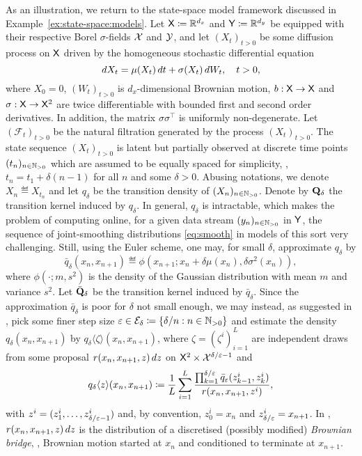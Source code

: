 \begin{example}
\label{eq:durham:gallant}
As an illustration, we return to the state-space model framework discussed in Example~\ref{ex:state-space:models}. Let $\mathsf{X} \coloneqq \mathbb{R}^{d_x}$ and $\mathsf{Y} \coloneqq \mathbb{R}^{d_y}$ be equipped with their respective Borel $\sigma$-fields $\mathcal{X}$ and $\mathcal{Y}$, and let $(X_t)_{t > 0}$ be some diffusion process on $\mathsf{X}$ driven by the homogeneous stochastic differential equation
\begin{equation} \label{eq:SDE}
\rmd X_t = \mu(X_t) \, \rmd t + \sigma(X_t) \, \rmd W_t, \quad t > 0, 
\end{equation}
where $X_0 = 0$, $(W_t)_{t > 0}$ is $d_x$-dimensional Brownian motion, $b : \mathsf{X} \to \mathsf{X}$ and $\sigma : \mathsf{X} \to \mathsf{X}^2$ are twice differentiable with bounded first and second order derivatives. In addition, the matrix $\sigma \sigma^\intercal$ is uniformly non-degenerate. Let $(\mathcal{F}_t)_{t > 0}$ be the natural filtration generated by the process $(X_t)_{t > 0}$. The state sequence $(X_t)_{t > 0}$ is latent but partially observed at discrete time points $(t_n)_{n \in \mathbb{N}_{> 0}}$ which are assumed to be equally spaced for simplicity, \ie, $t_n = t_1 + \delta (n - 1)$ for all $n$ and some $\delta > 0$. Abusing notations, we denote $X_n \eqdef X_{t_n}$ and let $q_\delta$ be the transition density of $(X_n)_{n \in \mathbb{N}_{> 0}}$. Denote by $\mathbf{Q}_\delta$ the transition kernel induced by $q_\delta$. In general, $q_\delta$ is intractable, which makes the problem of computing online, for a given data stream $(y_n)_{n \in \mathbb{N}_{> 0}}$ in $\mathsf{Y}$, the sequence of joint-smoothing distributions \eqref{eq:smooth} in models of this sort very challenging. Still, using the Euler scheme, one may, for small $\delta$, approximate $q_\delta$ by 
$$
\bar{q}_\delta(x_n, x_{n + 1}) \eqdef \phi(x_{n + 1}; x_n + \delta \mu(x_n), \delta \sigma^2(x_n)), 
$$ 
where $\phi(\cdot; m, s^2)$ is the density of the Gaussian distribution with mean $m$ and variance $s^2$. Let $\bar{\mathbf{Q}}_\delta$ be the transition kernel induced by $\bar{q}_\delta$. Since the approximation $\bar{q}_\delta$ is poor for $\delta$ not small enough, we may instead, as suggested in \cite{durham:gallant:2002}, pick some finer step size $\varepsilon \in \mathcal{E}_\delta \coloneqq \{ \delta / n : n \in \mathbb{N}_{> 0} \}$ and estimate the density $q_\delta(x_n, x_{n + 1})$ by $q_\delta \langle \zeta \rangle (x_n, x_{n + 1})$, where $\zeta = (\zeta^i)_{i = 1}^L$ are independent draws from some proposal $r(x_n, x_{n + 1}, z) \, d z$ on $\mathsf{X}^2 \times \mathcal{X}^{\delta / \varepsilon - 1}$ and  
$$
q_\delta \langle z \rangle (x_n, x_{n + 1}) \coloneqq \frac{1}{L} \sum_{i = 1}^L \frac{\prod_{k = 1}^{\delta / \varepsilon} \bar{q}_\varepsilon(z_{k - 1}^i, z_k^i)}{r(x_n, x_{n + 1}, z^i)},  
$$
with $z^i = (z_1^i, \ldots, z_{\delta / \varepsilon - 1}^i)$ and, by convention, $z_0^i = x_n$ and $z_{\delta / \varepsilon}^i = x_{n + 1}$. In \cite{durham:gallant:2002}, $r(x_n, x_{n + 1}, z) \, d z$ is the distribution of a discretised (possibly modified) \emph{Brownian bridge}, \ie, Brownian motion started at $x_n$ and conditioned to terminate at $x_{n + 1}$. 


\end{example}
